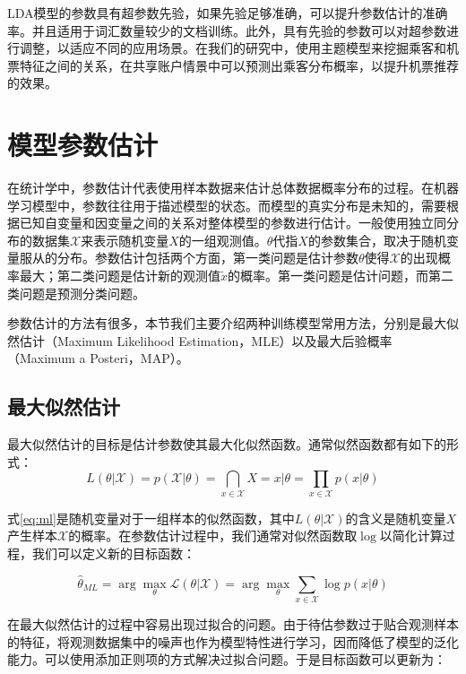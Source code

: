 LDA模型的参数具有超参数先验，如果先验足够准确，可以提升参数估计的准确率。并且适用于词汇数量较少的文档训练。此外，具有先验的参数可以对超参数进行调整，以适应不同的应用场景。在我们的研究中，使用主题模型来挖掘乘客和机票特征之间的关系，在共享账户情景中可以预测出乘客分布概率，以提升机票推荐的效果。


\iffalse
\section{模型参数估计}

在统计学中，参数估计\cite{heinrich2008parameter}代表使用样本数据来估计总体数据概率分布的过程。在机器学习模型中，参数往往用于描述模型的状态。而模型的真实分布是未知的，需要根据已知自变量和因变量之间的关系对整体模型的参数进行估计。一般使用独立同分布的数据集$\mathcal{X}$来表示随机变量$X$的一组观测值。$\theta$代指$X$的参数集合，取决于随机变量服从的分布。参数估计包括两个方面，第一类问题是估计参数$\theta$使得$\mathcal{X}$的出现概率最大；第二类问题是估计新的观测值$\tilde{x}$的概率。第一类问题是估计问题，而第二类问题是预测分类问题。

参数估计的方法有很多，本节我们主要介绍两种训练模型常用方法，分别是最大似然估计（Maximum Likelihood Estimation，MLE）\cite{johansen1990maximum}以及最大后验概率（Maximum a Posteri，MAP）\cite{gauvain1994maximum}。

\subsection{最大似然估计}

最大似然估计的目标是估计参数使其最大化似然函数。通常似然函数都有如下的形式：
\begin{equation}
\label{eq:ml}
	L(\theta|\mathcal{X}) = p(\mathcal{X}|\theta) = \bigcap_{x \in \mathcal{X}}{X=x|\theta} = \prod_{x \in \mathcal{X}}p(x|\theta)
\end{equation}

式\ref{eq:ml}是随机变量对于一组样本的似然函数，其中$L(\theta|\mathcal{X})$的含义是随机变量$X$产生样本$\mathcal{X}$的概率。在参数估计过程中，我们通常对似然函数取$\log$以简化计算过程，我们可以定义新的目标函数：

\begin{equation}
	\hat{\theta}_{ML} = \arg\max_\theta \mathcal{L}(\theta|\mathcal{X}) = \arg\max_\theta \sum_{x \in \mathcal{X}}\log p(x|\theta)
\end{equation}

在最大似然估计的过程中容易出现过拟合的问题。由于待估参数过于贴合观测样本的特征，将观测数据集中的噪声也作为模型特性进行学习，因而降低了模型的泛化能力。可以使用添加正则项的方式解决过拟合问题。于是目标函数可以更新为：

